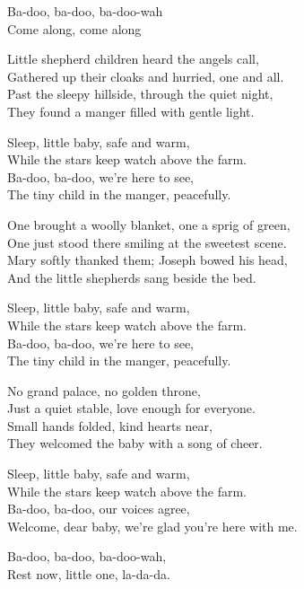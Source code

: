 \begin{lyrics}
Ba-doo, ba-doo, ba-doo-wah\\
Come along, come along

Little shepherd children heard the angels call,\\
Gathered up their cloaks and hurried, one and all.\\
Past the sleepy hillside, through the quiet night,\\
They found a manger filled with gentle light.

Sleep, little baby, safe and warm,\\
While the stars keep watch above the farm.\\
Ba-doo, ba-doo, we’re here to see,\\
The tiny child in the manger, peacefully.

One brought a woolly blanket, one a sprig of green,\\
One just stood there smiling at the sweetest scene.\\
Mary softly thanked them; Joseph bowed his head,\\
And the little shepherds sang beside the bed.

Sleep, little baby, safe and warm,\\
While the stars keep watch above the farm.\\
Ba-doo, ba-doo, we’re here to see,\\
The tiny child in the manger, peacefully.

No grand palace, no golden throne,\\
Just a quiet stable, love enough for everyone.\\
Small hands folded, kind hearts near,\\
They welcomed the baby with a song of cheer.

Sleep, little baby, safe and warm,\\
While the stars keep watch above the farm.\\
Ba-doo, ba-doo, our voices agree,\\
Welcome, dear baby, we’re glad you’re here with me.

Ba-doo, ba-doo, ba-doo-wah,\\
Rest now, little one, la-da-da.
\end{lyrics}


